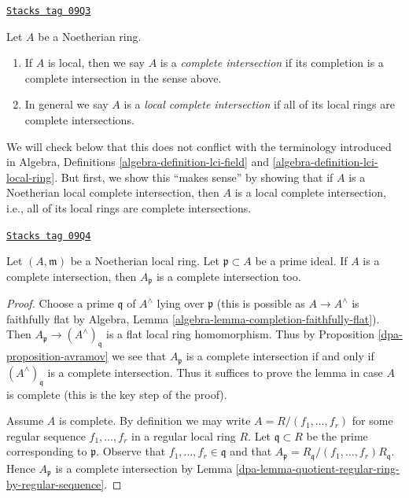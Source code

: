 \begin{definition}[Lci]
\label{dpa-definition-lci}
\href{https://stacks.math.columbia.edu/tag/09Q3}{\texttt{Stacks tag 09Q3}}

Let $A$ be a Noetherian ring.
\begin{enumerate}
\item If $A$ is local, then we say $A$ is a {\it complete intersection}
if its completion is a complete intersection in the sense above.
\item In general we say $A$ is a {\it local complete intersection}
if all of its local rings are complete intersections.
\end{enumerate}
\end{definition}

We will check below that this does not conflict with the terminology
introduced in
Algebra, Definitions \ref{algebra-definition-lci-field} and
\ref{algebra-definition-lci-local-ring}.
But first, we show this ``makes sense'' by showing
that if $A$ is a Noetherian
local complete intersection, then $A$ is a local complete intersection,
i.e., all of its local rings are complete intersections.

\begin{lemma}[Ci good]
\label{dpa-lemma-ci-good}
\href{https://stacks.math.columbia.edu/tag/09Q4}{\texttt{Stacks tag 09Q4}}

Let $(A, \mathfrak m)$ be a Noetherian local ring. Let
$\mathfrak p \subset A$ be a prime ideal. If $A$ is a complete
intersection, then $A_\mathfrak p$ is a complete intersection too.
\end{lemma}

\begin{proof}

Choose a prime $\mathfrak q$ of $A^\wedge$ lying over $\mathfrak p$
(this is possible as $A \to A^\wedge$ is faithfully flat by
Algebra, Lemma \ref{algebra-lemma-completion-faithfully-flat}).
Then $A_\mathfrak p \to (A^\wedge)_\mathfrak q$ is a flat local
ring homomorphism. Thus by Proposition \ref{dpa-proposition-avramov}
we see that $A_\mathfrak p$ is a complete intersection if and only if
$(A^\wedge)_\mathfrak q$ is a complete intersection. Thus it suffices
to prove the lemma in case $A$ is complete (this is the key step
of the proof).

\medskip\noindent
Assume $A$ is complete. By definition we may write
$A = R/(f_1, \ldots, f_r)$ for some regular sequence
$f_1, \ldots, f_r$ in a regular local ring $R$.
Let $\mathfrak q \subset R$ be the prime corresponding to $\mathfrak p$.
Observe that $f_1, \ldots, f_r \in \mathfrak q$ and that
$A_\mathfrak p = R_\mathfrak q/(f_1, \ldots, f_r)R_\mathfrak q$.
Hence $A_\mathfrak p$ is a complete intersection by
Lemma \ref{dpa-lemma-quotient-regular-ring-by-regular-sequence}.
\end{proof}

